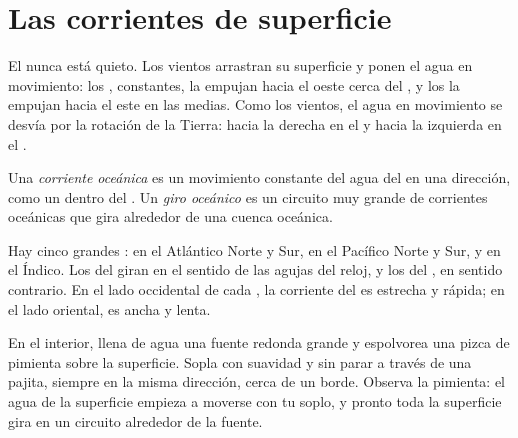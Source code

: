 \section{Las corrientes de superficie}

El  nunca está quieto. Los vientos arrastran su superficie y ponen el
agua en movimiento: los , constantes, la empujan hacia el oeste
cerca del , y los  la empujan hacia el este en las
 medias. Como los vientos, el agua en movimiento se desvía por la
rotación de la Tierra: hacia la derecha en el  y hacia la
izquierda en el .

\begin{definition}\label{def:g8:the-oceans:current}
Una \emph{corriente oceánica}
es un movimiento constante del agua del  en una dirección, como un 
dentro del . Un \emph{giro oceánico}
es un circuito muy grande de corrientes oceánicas que gira alrededor de
una cuenca oceánica.
\end{definition}
\label{def:g8:the-oceans:gyre}

Hay cinco grandes : en el Atlántico Norte y Sur, en el Pacífico Norte
y Sur, y en el  Índico. Los del  giran en el sentido
de las agujas del reloj, y los del , en sentido contrario. En
el lado occidental de cada , la corriente del  es estrecha y
rápida; en el lado oriental, es ancha y lenta.

\begin{inthelab}
En el interior, llena de agua una fuente redonda grande y espolvorea una
pizca de pimienta sobre la superficie. Sopla con suavidad y sin parar a
través de una pajita, siempre en la misma dirección, cerca de un borde.
Observa la pimienta: el agua de la superficie empieza a moverse con tu
soplo, y pronto toda la superficie gira en un circuito alrededor de la
fuente.
\end{inthelab}

